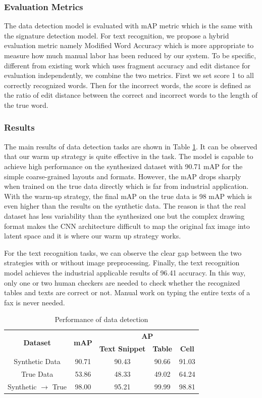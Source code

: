\documentclass[sigconf]{acmart}
\begin{document}
\subsubsection*{\rm \textbf{Evaluation Metrics}}
The data detection model is evaluated with mAP metric which is the same with the signature detection model. For text recognition, we propose a hybrid evaluation metric namely Modified Word Accuracy which is more appropriate to measure how much manual labor has been reduced by our system. To be specific, different from existing work \cite{borisyuk2018rosetta, shi2017end} which uses fragment accuracy and edit distance for evaluation independently, we combine the two metrics. First we set score 1 to all correctly recognized words. Then for the incorrect words, the score is defined as the ratio of edit distance between the correct and incorrect words to the length of the true word. 

\subsubsection*{\rm \textbf{Results}}
The main results of data detection tasks are shown in Table \ref{tabel_detection}. It can be observed that our warm up strategy is quite effective in the task. The model is capable to achieve high performance on the synthesized dataset with 90.71 mAP for the simple coarse-grained layouts and formats. However, the mAP drops sharply when trained on the true data directly which is far from industrial application. With the warm-up strategy, the final mAP on the true data is 98 mAP which is even higher than the results on the synthetic data. The reason is that the real dataset has less variability than the synthesized one but the complex drawing format makes the CNN architecture difficult to map the original fax image into latent space and it is where our warm up strategy works.

For the text recognition tasks, we can observe the clear gap between the two strategies with or without image preprocessing. Finally, the text recognition model achieves the industrial applicable results of 96.41 accuracy. In this way, only one or two human checkers are
needed to check whether the recognized tables and texts are correct or not. Manual work on typing the entire texts of a fax is never needed.

\begin{table}
	\caption{Performance of data detection}
	\label{tabel_detection}
	\centering
	\begin{tabular}{ccccc}
		\toprule
		\multirow{2}{1cm}{\textbf{Dataset}} & \multirow{2}{0.8cm}{\textbf{mAP}} & \multicolumn{3}{c}{\textbf{AP}}\\
		\cline{3-5}
		& & \textbf{Text Snippet} & \textbf{Table} & \textbf{Cell}\\
		\midrule
		Synthetic Data & 90.71 & 90.43 & 90.66 & 91.03 \\
		True Data & 53.86 & 48.33 & 49.02 & 64.24 \\
		Synthetic $\rightarrow$ True & 98.00 & 95.21 & 99.99 & 98.81 \\
		\bottomrule
	\end{tabular}
\end{table}
\end{document}
